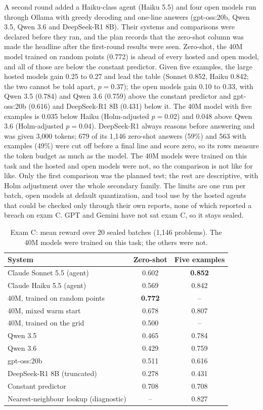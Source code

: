 \documentclass[11pt]{article}
\begin{document}
A second round added a Haiku-class agent (Haiku 5.5) and four open models run
through Ollama with greedy decoding and one-line answers (gpt-oss:20b,
Qwen 3.5, Qwen 3.6 and DeepSeek-R1 8B). Their systems and comparisons were
declared before they ran, and the plan records that the zero-shot column was
made the headline after the first-round results were seen. Zero-shot, the
40M model trained on random points (0.772) is ahead of every hosted and open
model, and all of those are below the constant predictor. Given five
examples, the large hosted models gain 0.25 to 0.27 and lead the table (Sonnet
0.852, Haiku 0.842; the two cannot be told apart, $p=0.37$); the open models
gain 0.10 to 0.33, with Qwen 3.5 (0.784) and Qwen 3.6 (0.759) above the
constant predictor and gpt-oss:20b (0.616) and DeepSeek-R1 8B (0.431) below it.
The 40M model with five examples is 0.035 below Haiku (Holm-adjusted $p=0.02$)
and 0.048 above Qwen 3.6 (Holm-adjusted $p=0.04$). DeepSeek-R1 always reasons
before answering and was given 3,000 tokens; 679 of its 1,146 zero-shot answers
(59\%) and 563 with examples (49\%) were cut off before a final line and score
zero, so its rows measure the token budget as much as the model. The 40M models
were trained on this task and the hosted and open models were not, so the
comparison is not like for like. Only the first comparison was the planned
test; the rest are descriptive, with Holm adjustment over the whole secondary
family. The limits are one run per batch, open models at default quantization,
and tool use by the hosted agents that could be checked only through their own
reports, none of which reported a breach on exam C. GPT and Gemini have not
sat exam C, so it stays sealed.

\begin{table}[t]
\centering\small
\begin{tabular}{@{}lcc@{}}
\toprule
System & Zero-shot & Five examples\\
\midrule
Claude Sonnet 5.5 (agent) & 0.602 & \textbf{0.852}\\
Claude Haiku 5.5 (agent) & 0.569 & 0.842\\
40M, trained on random points & \textbf{0.772} & --\\
40M, mixed warm start & 0.678 & 0.807\\
40M, trained on the grid & 0.500 & --\\
Qwen 3.5 & 0.465 & 0.784\\
Qwen 3.6 & 0.429 & 0.759\\
gpt-oss:20b & 0.511 & 0.616\\
DeepSeek-R1 8B (truncated) & 0.278 & 0.431\\
Constant predictor & 0.708 & 0.708\\
Nearest-neighbour lookup (diagnostic) & -- & 0.827\\
\bottomrule
\end{tabular}
\caption{Exam C: mean reward over 20 sealed batches (1,146 problems). The 40M
models were trained on this task; the others were not.}
\label{tab:examc}
\end{table}
\end{document}
